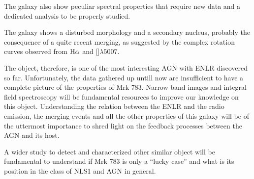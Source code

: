 \documentclass[../thesis.tex]{subfiles}
\begin{document}
The galaxy also show peculiar spectral properties that require new data and a dedicated analysis to be properly studied.

The galaxy shows a disturbed morphology and a secondary nucleus, probably the consequence of a quite recent merging, as suggested by the complex rotation curves observed from $\rm H\alpha$ and []$\lambda5007$.

The object, therefore, is one of the most interesting AGN with ENLR discovered so far.
Unfortunately, the data gathered up untill now are insufficient to have a complete picture of the properties of Mrk 783.
Narrow band images and integral field spectroscopy will be fundamental resources to improve our knowledge on this object.
Understanding the relation between the ENLR and the radio emission, the merging events and all the other properties of this galaxy will be of the uttermost importance to shred light on the feedback processes between the AGN and its host. 

A wider study to detect and characterized other similar object will be fundamental to understand if Mrk 783 is only a ``lucky case'' and what is its position in the class of NLS1 and AGN in general. 



























\biblio
\end{document}
